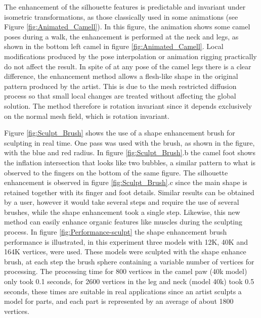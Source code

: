 \documentclass[10pt, conference]{IEEEtran}
\begin{document}
The enhancement of the silhouette features is predictable and invariant
under isometric transformations, as those classically used in some
animations (see Figure \ref{fig:Animated_Camell}). In this figure,
the animation shows some camel poses during a walk, the enhancement
is performed at the neck and legs, as shown in the bottom left camel
in figure \ref{fig:Animated_Camell}. Local modifications produced
by the pose interpolation or animation rigging practically do not
affect the result. In spite of at any pose of the camel legs there
is a clear difference, the enhancement method allows a flesh-like
shape in the original pattern produced by the artist. This is due
to the mesh restricted diffusion process so that small local changes
are treated without affecting the global solution. The method therefore
is rotation invariant since it depends exclusively on the normal mesh
field, which is rotation invariant. 

Figure \ref{fig:Sculpt_Brush} shows the use of a shape enhancement
brush for sculpting in real time. One pass was used with the brush,
as shown in the figure, with the blue and red radius. In figure \ref{fig:Sculpt_Brush}.b
the camel foot shows the inflation intersection that looks like two
bubbles, a similar pattern to what is observed to the fingers on the
bottom of the same figure. The silhouette enhancement is observed
in figure \ref{fig:Sculpt_Brush}.c since the main shape is retained
together with its finger and foot details. Similar results can be
obtained by a user, however it would take several steps and require
the use of several brushes, while the shape enhancement took a single
step. Likewise, this new method can easily enhance organic features
like muscles during the sculpting process. In figure \ref{fig:Performance-sculpt}
the shape enhancement brush performance is illustrated, in this experiment
three models with 12K, 40K and 164K vertices, were used. These models
were sculpted with the shape enhance brush, at each step the brush
sphere containing a variable number of vertices for processing. The
processing time for 800 vertices in the camel paw (40k model) only
took 0.1 seconds, for 2600 vertices in the leg and neck (model 40k)
took 0.5 seconds, these times are suitable in real applications since
an artist sculpts a model for parts, and each part is represented
by an average of about 1800 vertices.
\end{document}
